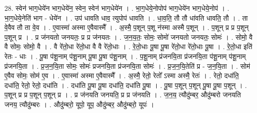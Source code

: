 \documentclass[17pt]{extarticle}
\begin{document}
28. स्वेन॑ भाग॒धेये॑न भाग॒धेये॑न॒ स्वेन॒ स्वेन॑ भाग॒धेये॑न । . भा॒ग॒धेये॒नोपोप॑ भाग॒धेये॑न भाग॒धेये॒नोप॑ । . भा॒ग॒धेये॒नेति॑ भाग - धेये॑न । . उप॑ धावति धाव॒ त्युपोप॑ धावति । . धा॒व॒ति॒ तौ तौ धा॑वति धावति॒ तौ । . ता वे॒वैव तौ ता वे॒व । . ए॒वास्मा॑ अस्मा ए॒वैवास्मै᳚ । . अ॒स्मै॒ प॒शून् प॒शू न॑स्मा अस्मै प॒शून् । . प॒शून् प्र प्र प॒शून् प॒शून् प्र । . प्र ज॑नयतो जनयतः॒ प्र प्र ज॑नयतः । . ज॒न॒य॒तः॒ सोमः॒ सोमो॑ जनयतो जनयतः॒ सोमः॑ । . सोमो॒ वै वै सोमः॒ सोमो॒ वै । . वै रे॑तो॒धा रे॑तो॒धा वै वै रे॑तो॒धाः । . रे॒तो॒धाः पू॒षा पू॒षा रे॑तो॒धा रे॑तो॒धाः पू॒षा । . रे॒तो॒धा इति॑ रेतः - धाः । . पू॒षा प॑शू॒नाम् प॑शू॒नाम् पू॒षा पू॒षा प॑शू॒नाम् । . प॒शू॒नाम् प्र॑जनयि॒ता प्र॑जनयि॒ता प॑शू॒नाम् प॑शू॒नाम् प्र॑जनयि॒ता । . प्र॒ज॒न॒यि॒ता सोमः॒ सोमः॑ प्रजनयि॒ता प्र॑जनयि॒ता सोमः॑ । . प्र॒ज॒न॒यि॒तेति॑ प्र - ज॒न॒यि॒ता । . सोम॑ ए॒वैव सोमः॒ सोम॑ ए॒व । . ए॒वास्मा॑ अस्मा ए॒वैवास्मै᳚ । . अ॒स्मै॒ रेतो॒ रेतो᳚ ऽस्मा अस्मै॒ रेतः॑ । . रेतो॒ दधा॑ति॒ दधा॑ति॒ रेतो॒ रेतो॒ दधा॑ति । . दधा॑ति पू॒षा पू॒षा दधा॑ति॒ दधा॑ति पू॒षा । . पू॒षा प॒शून् प॒शून् पू॒षा पू॒षा प॒शून् । . प॒शून् प्र प्र प॒शून् प॒शून् प्र । . प्र ज॑नयति जनयति॒ प्र प्र ज॑नयति । . ज॒न॒य॒ त्यौदु॑म्बर॒ औदु॑म्बरो जनयति जनय॒ त्यौदु॑म्बरः । . औदु॑म्बरो॒ यूपो॒ यूप॒ औदु॑म्बर॒ औदु॑म्बरो॒ यूपः॑ । \newline
\end{document}
